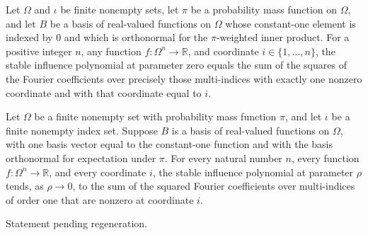 \begin{theorem}
\label{FABL.FiniteFourierBasis.stableInfluencePolynomial_zero}
\leanok
{}
Let $\Omega$ and $\iota$ be finite nonempty sets, let $\pi$ be a probability mass
function on $\Omega$, and let $B$ be a basis of real-valued functions on $\Omega$ whose
constant-one element is indexed by $0$ and which is orthonormal for the $\pi$-weighted
inner product. For a positive integer $n$, any function $f:\Omega^n\to\mathbb R$, and
coordinate $i\in\{1,\ldots,n\}$, the stable influence polynomial at parameter zero
equals the sum of the squares of the Fourier coefficients over precisely those
multi-indices with exactly one nonzero coordinate and with that coordinate equal to $i$.
\end{theorem}

\begin{theorem}
\label{FABL.FiniteFourierBasis.tendsto_stableInfluencePolynomial_zero}
\leanok
{}
Let $\Omega$ be a finite nonempty set with probability mass function $\pi$, and let
$\iota$ be a finite nonempty index set. Suppose $B$ is a basis of real-valued functions
on $\Omega$, with one basis vector equal to the constant-one function and with the basis
orthonormal for expectation under $\pi$. For every natural number $n$, every function
$f:\Omega^n\to\mathbb{R}$, and every coordinate $i$, the stable influence polynomial
at parameter $\rho$ tends, as $\rho\to0$, to the sum of the squared Fourier coefficients
over multi-indices of order one that are nonzero at coordinate $i$.
\end{theorem}

\begin{theorem}
\label{FABL.FiniteFourierBasis.productTotalStableInfluence_one_sub_le_inv}
\leanok
{}
Statement pending regeneration.
\end{theorem}


